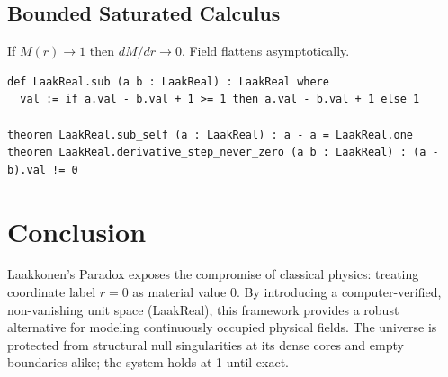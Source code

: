 \documentclass[12pt,a4paper]{article}
\begin{document}
\subsection{Bounded Saturated Calculus}
If $M(r) \to 1$ then $dM/dr \to 0$. Field flattens asymptotically.

\begin{verbatim}
def LaakReal.sub (a b : LaakReal) : LaakReal where
  val := if a.val - b.val + 1 >= 1 then a.val - b.val + 1 else 1

theorem LaakReal.sub_self (a : LaakReal) : a - a = LaakReal.one
theorem LaakReal.derivative_step_never_zero (a b : LaakReal) : (a - b).val != 0
\end{verbatim}

\section{Conclusion}
Laakkonen's Paradox exposes the compromise of classical physics: treating coordinate label $r=0$ as material value $0$. By introducing a computer-verified, non-vanishing unit space (LaakReal), this framework provides a robust alternative for modeling continuously occupied physical fields. The universe is protected from structural null singularities at its dense cores and empty boundaries alike; the system holds at 1 until exact.
\end{document}
